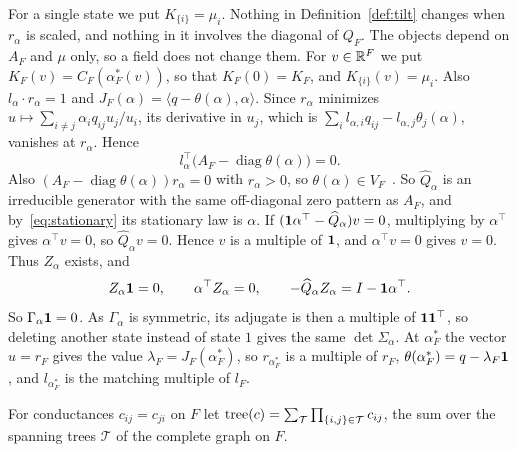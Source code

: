 For a single state we put $K_{\{i\}}=\mu_i$.
Nothing in Definition~\ref{def:tilt} changes when $r_\alpha$ is scaled, and nothing
in it involves the diagonal of $Q_F$. The objects depend on $A_F$ and $\mu$ only, so a
field does not change them. For $v\in\mathbb{R}^F$ we put $K_F(v)=C_F(\alpha^*_F(v))$, so
that $K_F(0)=K_F$, and $K_{\{i\}}(v)=\mu_i$. Also
$l_\alpha\cdot r_\alpha=1$ and $J_F(\alpha)=\langle q-\theta(\alpha),\alpha\rangle$. Since
$r_\alpha$ minimizes $u\mapsto\sum_{i\ne j}\alpha_iq_{ij}u_j/u_i$, its derivative in $u_j$, which
is $\sum_il_{\alpha,i}q_{ij}-l_{\alpha,j}\theta_j(\alpha)$, vanishes at $r_\alpha$. Hence
\begin{equation}\label{eq:stationary}
l_\alpha^\top\bigl(A_F-\operatorname{diag}\theta(\alpha)\bigr)=0 .
\end{equation}
Also $(A_F-\operatorname{diag}\theta(\alpha))r_\alpha=0$ with $r_\alpha>0$, so $\theta(\alpha)\in
V_F$~\cite{bermanplemmons1994}. So $\widehat Q_\alpha$ is an irreducible generator with the
same off-diagonal zero pattern as $A_F$, and by~\eqref{eq:stationary} its stationary law is
$\alpha$. If $(\mathbf{1}\alpha^\top-\widehat Q_\alpha)v=0$, multiplying by $\alpha^\top$ gives
$\alpha^\top v=0$, so $\widehat Q_\alpha v=0$. Hence $v$ is a multiple of $\mathbf{1}$, and
$\alpha^\top v=0$ gives $v=0$. Thus $Z_\alpha$ exists, and
\begin{equation}\label{eq:Zprops}
Z_\alpha\mathbf{1}=0,\qquad\alpha^\top Z_\alpha=0,\qquad
-\widehat Q_\alpha Z_\alpha=I-\mathbf{1}\alpha^\top .
\end{equation}
So $\Gamma_\alpha\mathbf{1}=0$. As $\Gamma_\alpha$ is symmetric, its adjugate is then a multiple of
$\mathbf{1}\mathbf{1}^\top$, so deleting another state instead of state $1$ gives the same
$\det\Sigma_\alpha$. At $\alpha^*_F$ the vector $u=r_F$ gives the value $\lambda_F=J_F(\alpha^*_F)$,
so $r_{\alpha^*_F}$ is a multiple of $r_F$, $\theta(\alpha^*_F)=q-\lambda_F\mathbf{1}$, and
$l_{\alpha^*_F}$ is the matching multiple of $l_F$.

For conductances $c_{ij}=c_{ji}$ on $F$ let
$\operatorname{tree}(c)=\sum_{\mathcal T}\prod_{\{i,j\}\in\mathcal T}c_{ij}$, the sum over
the spanning trees $\mathcal T$ of the complete graph on $F$.

